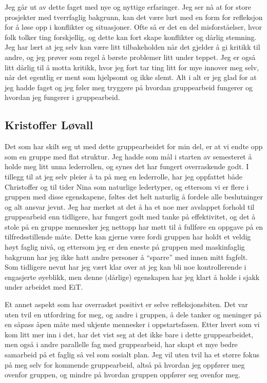 Jeg går ut av dette faget med nye og nyttige erfaringer. Jeg ser nå at for store prosjekter med tverrfaglig bakgrunn, kan det være lurt med en form for refleksjon for å løse opp i konflikter og situasjoner. 
Ofte så er det en del misforståelser, hvor folk tolker ting forskjellig, og dette kan fort skape konflikter og dårlig stemning.
Jeg har lært at jeg selv kan være litt tilbakeholden når det gjelder å gi kritikk til andre, og jeg prøver som regel å børste problemer litt under teppet.
Jeg er også litt dårlig til å motta kritikk, hvor jeg fort tar ting litt for mye innover meg selv, når det egentlig er ment som hjelpsomt og ikke slemt.
Alt i alt er jeg glad for at jeg hadde faget og jeg føler meg tryggere på hvordan gruppearbeid fungerer og hvordan jeg fungerer i gruppearbeid.

\subsection*{Kristoffer Løvall}
Det som har skilt seg ut med dette gruppearbeidet for min del, er at vi endte opp som en gruppe med flat struktur. Jeg hadde som mål i starten av 
semesteret å holde meg litt unna lederrollen, og synes det har fungert overraskende godt. I tillegg til at jeg selv pleier å ta på meg en lederrolle, har 
jeg oppfattet både Christoffer og til tider Nina som naturlige ledertyper, og ettersom vi er flere i gruppen med disse egenskapene, føltes det helt 
naturlig å fordele alle beslutninger og alt ansvar jevnt. Jeg har merket at det å ha et noe mer avslappet forhold til gruppearbeid enn tidligere, har 
fungert godt med tanke på effektivitet, og det å stole på en gruppe mennesker jeg nettopp har møtt til å fullføre en oppgave på en 
tilfredsstillende måte. Dette kan gjerne være fordi gruppen har holdt et veldig høyt faglig nivå, og ettersom jeg er den eneste på gruppen med 
maskinfaglig bakgrunn har jeg ikke hatt andre personer å ``sparre'' med innen mitt fagfelt. Som tidligere nevnt har jeg vært klar over at jeg kan bli 
noe kontrollerende i engasjerte øyeblikk, men denne (dårlige) egenskapen har jeg klart å holde i sjakk under arbeidet med EiT. 

Et annet aspekt som 
har overrasket positivt er selve refleksjonsbiten. Det var uten tvil en utfordring for meg, og andre i gruppen, å dele tanker og meninger på en 
såpass åpen måte med ukjente mennesker i oppstartsfasen. Etter hvert som vi kom litt mer inn i det, har det vist seg at det ikke bare i dette 
gruppearbeidet, men også i andre parallelle fag med gruppearbeid, har skapt et mye bedre samarbeid på et faglig så vel som sosialt plan. Jeg vil 
uten tvil ha et større fokus på meg selv for kommende gruppearbeid, altså på hvordan jeg oppfører meg ovenfor gruppen, og mindre på hvordan 
gruppen oppfører seg ovenfor meg.

